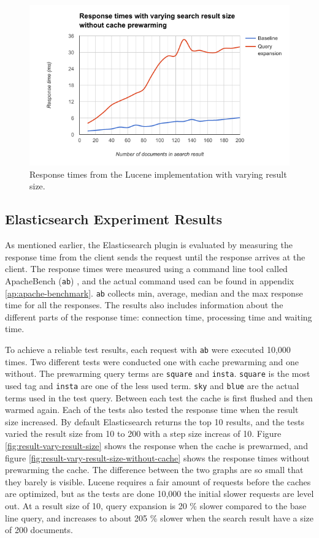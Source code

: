 \begin{figure}[h!]
  \centering \includegraphics[width=1\linewidth]{img/lucene-results.png}
  \caption{Response times from the Lucene implementation with varying result size.}
  \label{fig:lucene-results}
\end{figure}

\subsection{Elasticsearch Experiment Results}
As mentioned earlier,
the Elasticsearch plugin is evaluated by measuring the response time from the client sends the request until the response arrives at the client.
The response times were measured using a command line tool called ApacheBench (\texttt{ab}) \cite{apache-benchmark},
and the actual command used can be found in appendix \ref{ap:apache-benchmark}.
\texttt{ab} collects min, average, median and the max response time for all the responses.
The results also includes information about the different parts of the response time:
connection time, processing time and waiting time.

To achieve a reliable test results,
each request with \texttt{ab} were executed 10,000 times.
Two different tests were conducted one with cache prewarming and one without.
The prewarming query terms are \texttt{square} and \texttt{insta}.
\texttt{square} is the most used tag and \texttt{insta} are one of the less used term.
\texttt{sky} and \texttt{blue} are the actual terms used in the test query.
Between each test the cache is first flushed and then warmed again.
Each of the tests also tested the response time when the result size increased.
By default Elasticsearch returns the top 10 results,
and the tests varied the result size from 10 to 200 with a step size increas of 10.
Figure \ref{fig:result-vary-result-size} shows the response when the cache is prewarmed,
and figure \ref{fig:result-vary-result-size-without-cache} shows the response times without prewarming the cache.
The difference between the two graphs are so small that they barely is visible.
Lucene requires a fair amount of requests before the caches are optimized,
but as the tests are done 10,000 the initial slower requests are level out.
At a result size of 10, query expansion is 20 \% slower compared to the base line query,
and increases to about 205 \% slower when the search result have a size of 200 documents.

